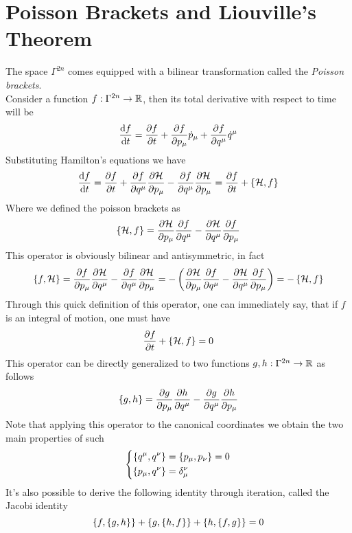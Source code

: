 \documentclass[../admech.tex]{subfiles}
\begin{document}
\section{Poisson Brackets and Liouville's Theorem}
\begin{dfn}
The space $\Gamma^{2n}$ comes equipped with a bilinear transformation called the \emph{Poisson brackets}.\\
Consider a function $f:\Gamma^{2n}\to\operatorname{\mathbb{R}}$, then its total derivative with respect to time will be
\begin{equation}
	\dv{f}{t}=\pdv{f}{t}+\pdv{f}{p_\mu}\dot{p}_\mu+\pdv{f}{q^\mu}\dot{q}^\mu
	\label{eq:totderphs}
\end{equation}
Substituting Hamilton's equations we have
\begin{equation}
	\dv{f}{t}=\pdv{f}{t}+\pdv{f}{q^\mu}\pdv{\mathcal{H}}{p_\mu}-\pdv{f}{q^\mu}\pdv{\mathcal{H}}{p_\mu}=\pdv{f}{t}+\left\{\mathcal{H},f\right\}
	\label{eq:poissontd}
\end{equation}
Where we defined the poisson brackets as
\begin{equation}
	\left\{\mathcal{H},f\right\}=\pdv{\mathcal{H}}{p_\mu}\pdv{f}{q^\mu}-\pdv{\mathcal{H}}{q^\mu}\pdv{f}{p_\mu}
	\label{eq:poissondef}
\end{equation}
This operator is obviously bilinear and antisymmetric, in fact
\begin{equation*}
	\left\{f,\mathcal{H}\right\}=\pdv{f}{p_\mu}\pdv{\mathcal{H}}{q^\mu}-\pdv{f}{q^\mu}\pdv{\mathcal{H}}{p_\mu}=-\left( \pdv{\mathcal{H}}{p_\mu}\pdv{f}{q^\mu}-\pdv{\mathcal{H}}{q^\mu}\pdv{f}{p_\mu} \right)=-\left\{\mathcal{H},f\right\}
\end{equation*}
Through this quick definition of this operator, one can immediately say, that if $f$ is an integral of motion, one must have
\begin{equation}
	\pdv{f}{t}+\left\{\mathcal{H},f\right\}=0
	\label{eq:iompoisson}
\end{equation}
This operator can be directly generalized to two functions $g,h:\Gamma^{2n}\to\operatorname{\mathbb{R}}$ as follows
\begin{equation}
	\left\{g,h\right\}=\pdv{g}{p_\mu}\pdv{h}{q^\mu}-\pdv{g}{q^\mu}\pdv{h}{p_\mu}
	\label{eq:poisson2f}
\end{equation}
Note that applying this operator to the canonical coordinates we obtain the two main properties of such
\begin{equation}
	\left\{ \begin{aligned}
			\left\{q^\mu,q^\nu\right\}&=\left\{p_\mu,p_\nu\right\}=0\\
			\left\{p_\mu,q^\nu\right\}&=\delta^\nu_\mu
	\end{aligned}\right.
	\label{eq:poissonccord}
\end{equation}
It's also possible to derive the following identity through iteration, called the Jacobi identity
\begin{equation}
	\left\{f,\left\{g,h\right\}\right\}+\left\{g,\left\{h,f\right\}\right\}+\left\{h,\left\{f,g\right\}\right\}=0
	\label{eq:jacobiid}
\end{equation}
\end{dfn}
\end{document}

